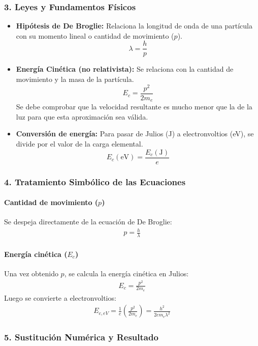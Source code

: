 \subsubsection*{3. Leyes y Fundamentos Físicos}
\begin{itemize}
    \item \textbf{Hipótesis de De Broglie:} Relaciona la longitud de onda de una partícula con su momento lineal o cantidad de movimiento ($p$).
    $$\lambda = \frac{h}{p}$$
    \item \textbf{Energía Cinética (no relativista):} Se relaciona con la cantidad de movimiento y la masa de la partícula.
    $$E_c = \frac{p^2}{2m_e}$$
    Se debe comprobar que la velocidad resultante es mucho menor que la de la luz para que esta aproximación sea válida.
    \item \textbf{Conversión de energía:} Para pasar de Julios (J) a electronvoltios (eV), se divide por el valor de la carga elemental.
    $$E_c (\text{eV}) = \frac{E_c (\text{J})}{e}$$
\end{itemize}

\subsubsection*{4. Tratamiento Simbólico de las Ecuaciones}
\paragraph{Cantidad de movimiento ($p$)}
Se despeja directamente de la ecuación de De Broglie:
\begin{gather}
    p = \frac{h}{\lambda}
\end{gather}
\paragraph{Energía cinética ($E_c$)}
Una vez obtenido $p$, se calcula la energía cinética en Julios:
\begin{gather}
    E_c = \frac{p^2}{2m_e}
\end{gather}
Luego se convierte a electronvoltios:
\begin{gather}
    E_{c,eV} = \frac{1}{e} \left( \frac{p^2}{2m_e} \right) = \frac{h^2}{2e m_e \lambda^2}
\end{gather}

\subsubsection*{5. Sustitución Numérica y Resultado}
